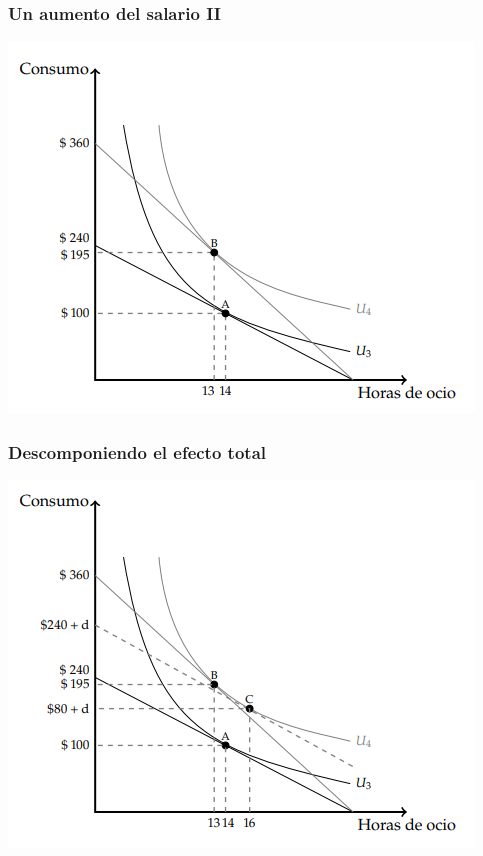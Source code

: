 \documentclass{beamer}
\begin{document}
\begin{frame}
  \frametitle{Un aumento del salario II}
  \begin{center}
    \includegraphics[scale=0.8]{../Figures/C9.9.png}
  \end{center}
\end{frame}

\begin{frame}
  \frametitle{Descomponiendo el efecto total}
  \begin{center}
    \includegraphics[scale=0.8]{../Figures/C9.10.png}
  \end{center}
\end{frame}
\end{document}
